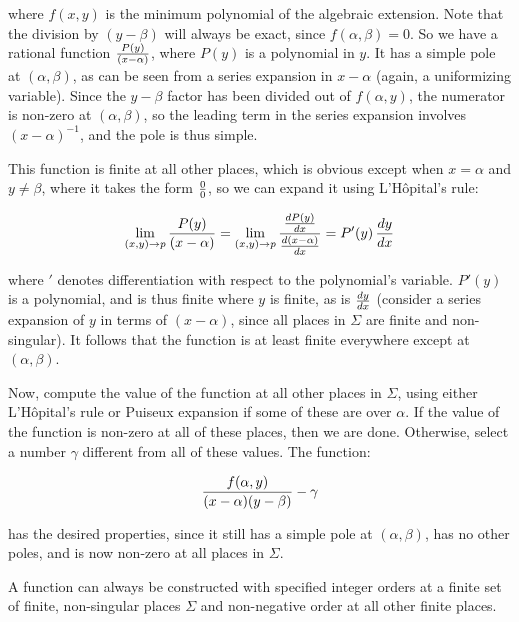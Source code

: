 where $f(x,y)$ is the minimum polynomial of the algebraic extension.
Note that the division by $(y-\beta)$ will always be exact, since
$f(\alpha, \beta)=0$.  So we have a rational function
$P(y)\over(x-\alpha)$, where $P(y)$ is a polynomial in $y$.  It has a
simple pole at $(\alpha, \beta)$, as can be seen from a series
expansion in $x-\alpha$ (again, a uniformizing variable).  Since the
$y-\beta$ factor has been divided out of $f(\alpha,y)$, the numerator
is non-zero at $(\alpha, \beta)$, so the leading term in the series
expansion involves $(x-\alpha)^{-1}$, and the pole is thus simple.

This function is finite at all other places, which is obvious except
when $x=\alpha$ and $y\ne\beta$, where it takes the form $0\over0$,
so we can expand it using L'H\^opital's rule:

$$\lim_{(x,y)\to p} {{P(y)}\over(x-\alpha)}
  = \lim_{{(x,y)\to p}} {{{dP(y)}\over{dx}}\over{{d(x-\alpha)}\over{dx}}}
  = P'(y) \, {{dy}\over{dx}} $$

where $'$ denotes differentiation with respect to the polynomial's
variable.  $P'(y)$ is a polynomial, and is thus finite where $y$ is
finite, as is ${dy}\over{dx}$ (consider a series expansion of $y$ in
terms of $(x-\alpha)$, since all places in $\Sigma$ are finite and
non-singular).  It follows that the function is at least finite
everywhere except at $(\alpha, \beta)$.

Now, compute the value of the function at all other places in
$\Sigma$, using either L'H\^opital's rule or Puiseux expansion if some
of these are over $\alpha$.  If the value of the function is non-zero
at all of these places, then we are done.  Otherwise, select a number
$\gamma$ different from all of these values.  The function:

$${f(\alpha,y)\over(x-\alpha)(y-\beta)} - \gamma$$

has the desired properties, since it still has a simple pole at
$(\alpha,\beta)$, has no other poles, and is now non-zero at all
places in $\Sigma$.


\endtheorem

\vfill\eject

\theorem
\label{finite orders construction}

A function can always be constructed with specified integer orders at
a finite set of finite, non-singular places $\Sigma$ and non-negative
order at all other finite places.

\proof

